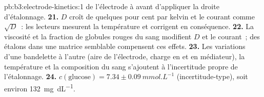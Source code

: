 \begin{solution}{pb:b3:electrode-kinetics:1}
de l'électrode à  avant d'appliquer la droite d'étalonnage.
\textbf{21.} $D$ croît de quelques pour cent par kelvin et le courant
comme $\sqrt D$~: les lecteurs mesurent la température et corrigent en
conséquence.
\textbf{22.} La viscosité et la fraction de globules rouges du sang
modifient $D$ et le courant~; des étalons dans une matrice semblable
compensent ces effets.
\textbf{23.} Les variations d'une bandelette à l'autre (aire de
l'électrode, charge en  et en médiateur), la température et la
composition du sang s'ajoutent à l'incertitude propre de l'étalonnage.
\textbf{24.} \textbf{$c(\text{glucose}) = 7.34 \pm \qty{0.09}{mmol.L^{-1}}$}
(incertitude-type), soit environ \qty{132}{mg.dL^{-1}}.
\end{solution}
